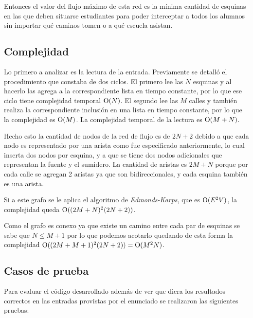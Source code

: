 Entonces el valor del flujo máximo de esta red es la mínima cantidad de esquinas en las que deben situarse estudiantes para poder interceptar a todos los alumnos sin importar qué caminos tomen o a qué escuela asistan.

\subsection{Complejidad}

Lo primero a analizar es la lectura de la entrada. Previamente se detalló el procedimiento que constaba de dos ciclos. El primero lee las $N$ esquinas y al hacerlo las agrega a la correspondiente lista en tiempo constante, por lo que ese ciclo tiene complejidad temporal $\operatorname{O}(N)$. El segundo lee las $M$ calles y también realiza la correspondiente inclusión en una lista en tiempo constante, por lo que la complejidad es $\operatorname{O}(M)$. La complejidad temporal de la lectura es $\operatorname{O}(M + N)$.

Hecho esto la cantidad de nodos de la red de flujo es de $2N + 2$ debido a que cada nodo es representado por una arista como fue especificado anteriormente, lo cual inserta dos nodos por esquina, y a que se tiene dos nodos adicionales que representan la fuente y el sumidero. La cantidad de aristas es $2M + N$ porque por cada calle se agregan 2 aristas ya que son bidireccionales, y cada esquina también es una arista.

Si a este grafo se le aplica el algoritmo de \textit{Edmonds-Karps}, que es $\operatorname{O}(E^2V)$, la complejidad queda $\operatorname{O}((2M + N)^2(2N + 2))$.

Como el grafo es conexo ya que existe un camino entre cada par de esquinas se sabe que $N \leq M + 1$ por lo que podemos acotarlo quedando de esta forma la complejidad $\operatorname{O}((2M + M + 1)^2(2N + 2)) = \operatorname{O}(M^2N)$.

\subsection{Casos de prueba}

Para evaluar el código desarrollado además de ver que diera los resultados
correctos en las entradas provistas por el enunciado se realizaron las
siguientes pruebas:


